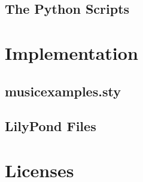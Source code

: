\documentclass[../openLilyLib]{subfiles}
\begin{document}
\section{The Python Scripts}

\chapter{Implementation}

\section{musicexamples.sty}

\section{LilyPond Files}

\chapter{Licenses}

\end{document}

